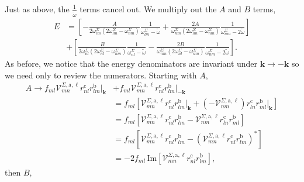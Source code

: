 Just as above, the $\frac{1}{\tilde\omega}$ terms cancel out. We multiply out
the $A$ and $B$ terms,
\begin{align}\label{emultipied}  
E&=  
\left[
-\frac{A}{2\omega^\Sigma_{lm}(2\omega^\Sigma_{lm}-\omega^\Sigma_{nm})}
 \frac{1}{\omega^\Sigma_{lm}-\tilde\omega}
+\frac{2A}{\omega^\Sigma_{nm}(2\omega^\Sigma_{lm}-\omega^\Sigma_{nm})}
 \frac{1}{\omega^\Sigma_{nm}-2\tilde\omega}
\right]\nonumber\\
&+ 
\left[
 \frac{B}{2\omega^\Sigma_{nl}(2\omega^\Sigma_{nl}-\omega^\Sigma_{nm})}
 \frac{1}{\omega^\Sigma_{nl}-\tilde\omega}
-\frac{2B}{\omega^\Sigma_{nm}(2\omega^\Sigma_{nl}-\omega^\Sigma_{nm})}
 \frac{1}{\omega^\Sigma_{nm}-2\tilde\omega}
\right].
\end{align}  
As before, we notice that the energy denominators are invariant under
$\mathbf{k} \rightarrow - \mathbf{k}$ so we need only to review the numerators.
Starting with $A$,
\begin{align*}
A \rightarrow f_{ml}\mathcal{V}^{\Sigma,\text{a},\ell}_{mn}
    r^{\text{c}}_{nl}r^{\text{b}}_{lm}\vert_{\mathbf{k}}
&+  f_{ml}\mathcal{V}^{\Sigma,\text{a},\ell}_{mn}r^{\text{c}}_{nl}
    r^{\text{b}}_{lm}\vert_{-\mathbf{k}}\nonumber\\
&=  f_{ml}\left[\mathcal{V}^{\Sigma,\text{a},\ell}_{mn}
    r^{\text{c}}_{nl}r^{\text{b}}_{lm}\vert_{\mathbf{k}} 
+   \left(-\mathcal{V}^{\Sigma,\text{a},\ell}_{nm}\right)
    r^{\text{c}}_{ln}r^{\text{b}}_{ml}\vert_{\mathbf{k}}\right]\nonumber\\
&=  f_{ml}\left[\mathcal{V}^{\Sigma,\text{a},\ell}_{mn}
    r^{\text{c}}_{nl}r^{\text{b}}_{lm} 
-   \mathcal{V}^{\Sigma,\text{a},\ell}_{nm}
    r^{\text{c}}_{ln}r^{\text{b}}_{ml}\right]\nonumber\\
&=  f_{ml}\left[\mathcal{V}^{\Sigma,\text{a},\ell}_{mn}
    r^{\text{c}}_{nl}r^{\text{b}}_{lm}
-   \left(\mathcal{V}^{\Sigma,\text{a},\ell}_{mn}
    r^{\text{c}}_{nl}r^{\text{b}}_{lm}\right)^{*}\right]\nonumber\\
&= -2f_{ml}\,\mathrm{Im}\left[\mathcal{V}^{\Sigma,\text{a},\ell}_{mn}
    r^{\text{c}}_{nl}r^{\text{b}}_{lm}\right],
\end{align*}
then $B$,
